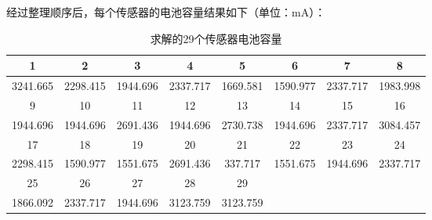 \documentclass{article}
\begin{document}
经过整理顺序后，每个传感器的电池容量结果如下（单位：mA）：
\vspace{1ex}
\begin{table}[H]
    \begin{tabular}{|c|c|c|c|c|ccc|}
        \hline
        1   &   2   &   3   &   4   &   5   &   \multicolumn{1}{c|}{6}   &   \multicolumn{1}{c|}{7}   &   \multicolumn{1}{c|}{8}\\
        \hline
        3241.665    &   2298.415	&   1944.696	&   2337.717	&   1669.581	&   \multicolumn{1}{c|}{1590.977}	&   \multicolumn{1}{c|}{2337.717}	&   \multicolumn{1}{c|}{1983.998}\\
        \hline
        9	&   10	&   11	&   12	&   13	&   \multicolumn{1}{c|}{14}	&   \multicolumn{1}{c|}{15}	&   \multicolumn{1}{c|}{16}\\
        \hline
        1944.696	&   1944.696	&   2691.436	&   1944.696	&   2730.738	&   \multicolumn{1}{c|}{1944.696}	&   \multicolumn{1}{c|}{2337.717}	&   \multicolumn{1}{c|}{3084.457}\\
        \hline
        17	&   18	&   19	&   20	&   21	 &  \multicolumn{1}{c|}{22}	&   \multicolumn{1}{c|}{23}	&   \multicolumn{1}{c|}{24}\\
        \hline
        2298.415    &   1590.977    &   1551.675    &   2691.436    &   337.717    &   \multicolumn{1}{c|}{1551.675}    &   \multicolumn{1}{c|}{1944.696}    &   \multicolumn{1}{c|}{2337.717}\\
        \hline
        25    &   26    &   27    &   28    &   29\\
        \cline{1-5}
        1866.092    &   2337.717    &  1944.696    &  3123.759    &  3123.759\\
        \cline{1-5}
    \end{tabular}
\caption{求解的29个传感器电池容量}
\end{table}
\end{document}
